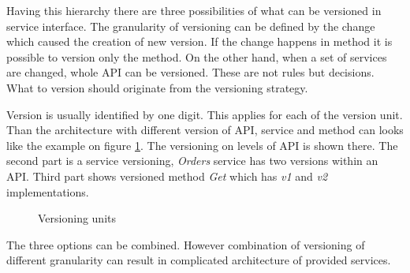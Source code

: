Having this hierarchy there are three possibilities of what can be versioned in service interface. The granularity of versioning can be defined by the change which caused the creation of new version. If the change happens in method it is possible to version only the method. On the other hand, when a set of services are changed, whole API can be versioned. These are not rules but decisions. What to version should originate from the versioning strategy. 


Version is usually identified by one digit. This applies for each of the version unit. Than the architecture with different version of API, service and method can looks like the example on figure \ref{fig:version-unit}. The versioning on levels of API is shown there. The second part is a service versioning, \emph{Orders} service has two versions within an API. Third part shows versioned method \emph{Get} which has \emph{v1} and \emph{v2} implementations.


\begin{figure}[htp] 
\caption{Versioning units}
\label{fig:version-unit}
\end{figure} 


The three options can be combined. However combination of versioning of different granularity can result in complicated architecture of provided services.



